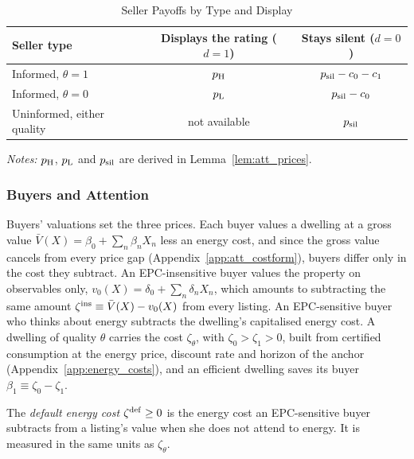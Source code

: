 \begin{table}[htbp]
\centering
\caption{Seller Payoffs by Type and Display}
\label{tab:att_payoffs}
\small\renewcommand{\arraystretch}{1.4}
\begin{tabular*}{\textwidth}{@{\extracolsep{\fill}}lcc@{}}
\toprule\toprule
\textbf{Seller type} & \textbf{Displays the rating ($d=1$)} & \textbf{Stays silent ($d=0$)} \\
\midrule
Informed, $\theta=1$ & $p_{\rm H}$ & $p_{\rm sil}-c_0-c_1$ \\
Informed, $\theta=0$ & $p_{\rm L}$ & $p_{\rm sil}-c_0$ \\
Uninformed, either quality & not available & $p_{\rm sil}$ \\
\bottomrule\bottomrule
\end{tabular*}

\vspace{0.5em}
\raggedright
\footnotesize
\textit{Notes:} $p_{\rm H}$, $p_{\rm L}$ and $p_{\rm sil}$ are derived in Lemma~\ref{lem:att_prices}.
\end{table}

\subsubsection{Buyers and Attention}

Buyers' valuations set the three prices. Each buyer values a dwelling at a gross value $\bar V(X)=\beta_0+\sum_n\beta_nX_n$ less an energy cost, and since the gross value cancels from every price gap (Appendix~\ref{app:att_costform}), buyers differ only in the cost they subtract. An EPC-insensitive buyer values the property on observables only, $v_0(X)=\delta_0+\sum_n\delta_n X_n$, which amounts to subtracting the same amount $\zeta^{\rm ins}\equiv\bar V(X)-v_0(X)$ from every listing. An EPC-sensitive buyer who thinks about energy subtracts the dwelling's capitalised energy cost. A dwelling of quality $\theta$ carries the cost $\zeta_\theta$, with $\zeta_0>\zeta_1>0$, built from certified consumption at the energy price, discount rate and horizon of the anchor (Appendix~\ref{app:energy_costs}), and an efficient dwelling saves its buyer $\beta_1\equiv\zeta_0-\zeta_1$.

\begin{definition}
\label{def:default_cost}
The \emph{default energy cost} $\zeta^{\rm def}\ge0$ is the energy cost an EPC-sensitive buyer subtracts from a listing's value when she does not attend to energy. It is measured in the same units as $\zeta_\theta$.
\end{definition}

